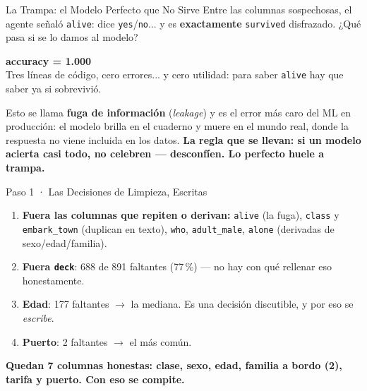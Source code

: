 \documentclass[aspectratio=169, 11pt]{beamer}
\begin{document}
\begin{frame}[shrink=5]{La Trampa: el Modelo Perfecto que No Sirve}
  \vspace{2pt}
  {\scriptsize\color{textMuted}
   Entre las columnas sospechosas, el agente señaló \texttt{alive}: dice
   \texttt{yes}/\texttt{no}... y es \textbf{exactamente} \texttt{survived}
   disfrazado. ¿Qué pasa si se lo damos al modelo?}
  \vspace{2pt}
  \begin{tcolorbox}[colback=arcaGray, colframe=arcaRed, boxrule=0pt,
    leftrule=4pt, arc=3pt, left=10pt, right=10pt, top=4pt, bottom=4pt]
    \begin{center}
    {\Huge\color{arcaRed}\bfseries accuracy = 1.000}\\[2pt]
    {\scriptsize\color{textMuted}
     Tres líneas de código, cero errores... y cero utilidad: para saber
     \texttt{alive} hay que saber ya si sobrevivió.}
    \end{center}
  \end{tcolorbox}
  \vspace{2pt}
  {\scriptsize\color{textMuted}
   Esto se llama \textbf{fuga de información} (\emph{leakage}) y es el error
   más caro del ML en producción: el modelo brilla en el cuaderno y muere en
   el mundo real, donde la respuesta no viene incluida en los datos.}
  \vspace{2pt}
  {\scriptsize\color{arcaDark}\bfseries
   La regla que se llevan: si un modelo acierta casi todo, no celebren ---
   desconfíen. Lo perfecto huele a trampa.}
\end{frame}

\begin{frame}[shrink=5]{Paso 1 · Las Decisiones de Limpieza, Escritas}
  \vspace{2pt}
  {\footnotesize\color{textMuted}
  \begin{enumerate}\setlength{\itemsep}{5pt}
    \item \textbf{Fuera las columnas que repiten o derivan:} \texttt{alive}
          (la fuga), \texttt{class} y \texttt{embark\_town} (duplican en
          texto), \texttt{who}, \texttt{adult\_male}, \texttt{alone}
          (derivadas de sexo/edad/familia).
    \item \textbf{Fuera \texttt{deck}}: 688 de 891 faltantes (77\,\%) ---
          no hay con qué rellenar eso honestamente.
    \item \textbf{Edad}: 177 faltantes $\to$ la mediana. Es una decisión
          discutible, y por eso se \emph{escribe}.
    \item \textbf{Puerto}: 2 faltantes $\to$ el más común.
  \end{enumerate}}
  \vspace{6pt}
  \begin{tcolorbox}[colback=arcaGray, colframe=codeGreen, boxrule=0pt,
    leftrule=3pt, arc=3pt, left=9pt, right=9pt, top=5pt, bottom=5pt]
    {\footnotesize\color{arcaDark}\bfseries
     Quedan 7 columnas honestas: clase, sexo, edad, familia a bordo (2),
     tarifa y puerto. Con eso se compite.}
  \end{tcolorbox}
\end{frame}
\end{document}
